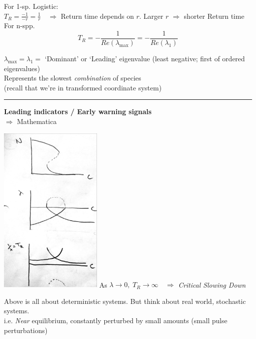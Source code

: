 \documentclass{article}
\newcommand{\note}[1]{\colorbox{gray!30}{#1}}
\newcommand{\ind}{\-\hspace{1cm}}
\begin{document}
For 1-sp. Logistic:\\
\ind $T_R=\frac{-1}{-r}=\frac{1}{r} \quad \Rightarrow$ Return time depends on $r$.  Larger $r$ $\Rightarrow$ shorter Return time\\

For n-spp.\\
\begin{equation*}
T_R=-\frac{1}{Re(\lambda_\text{max})} = -\frac{1}{Re(\lambda_1)}
\end{equation*}

\ind $\lambda_{\text{max}} = \lambda_1 = $ `Dominant' or `Leading' eigenvalue (least negative; first of ordered eigenvalues)\\
\ind \ind Represents the slowest \emph{combination} of species\\
\ind \ind \ind (recall that we're in transformed coordinate system)

\rule[0.5ex]{\linewidth}{1pt}

\textbf{Leading indicators / Early warning signals}\\
\note{$\Rightarrow$ Mathematica}
\begin{center}
 	\includegraphics[width=5cm]{figs/Exploitation_CriticalSlowingDown.pdf}
 	As $\lambda \to 0, \; T_R \to \infty \quad \Rightarrow$ \emph{Critical Slowing Down}
\end{center}

Above is all about deterministic systems.  But think about real world, stochastic systems.\\
\ind i.e. \emph{Near} equilibrium,  constantly perturbed by small amounts (small pulse perturbations)\\
\end{document}
